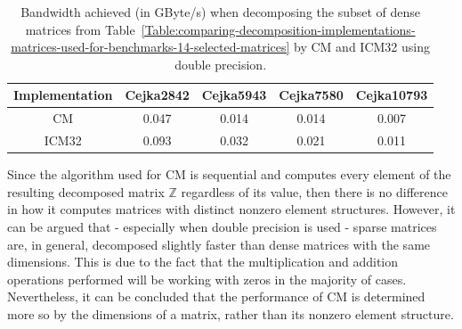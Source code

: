 \begin{table}[ht!]
	\centering
	\renewcommand{\arraystretch}{1.5}
	\begin{tabular}{ |c|c|c|c|c| } 
		\hline
		Implementation & Cejka2842 & Cejka5943 & Cejka7580 & Cejka10793 \\
		\hline
		CM             &     0.047 &     0.014 &     0.014 & 0.007      \\
		\hline
		ICM32          &     0.093 &     0.032 &     0.021 & 0.011      \\
		\hline
	\end{tabular}
	\caption{Bandwidth achieved (in GByte/s) when decomposing the subset of dense matrices from Table~\ref{Table:comparing-decomposition-implementations-matrices-used-for-benchmarks-14-selected-matrices} by CM and ICM32 using double precision.}
	\label{Table:comparing-decomposition-implementations-bandwidth-of-the-implementations-dense-matrices-bandwidth}
\end{table}

Since the algorithm used for CM is sequential and computes every element of the resulting decomposed matrix $ \mathbb{Z} $ regardless of its value, then there is no difference in how it computes matrices with distinct nonzero element structures. However, it can be argued that - especially when double precision is used - sparse matrices are, in general, decomposed slightly faster than dense matrices with the same dimensions. This is due to the fact that the multiplication and addition operations performed will be working with zeros in the majority of cases. Nevertheless, it can be concluded that the performance of CM is determined more so by the dimensions of a matrix, rather than its nonzero element structure.


